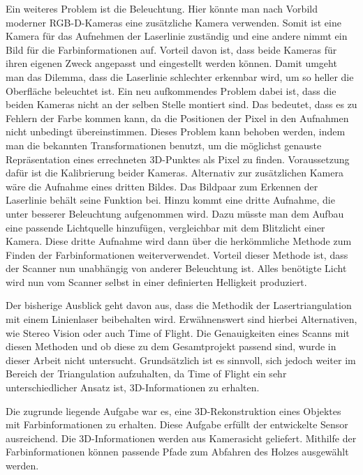 	Ein weiteres Problem ist die Beleuchtung. Hier könnte man nach Vorbild moderner RGB-D-Kameras eine zusätzliche Kamera verwenden. Somit ist eine Kamera für das Aufnehmen der Laserlinie zuständig und eine andere nimmt ein Bild für die Farbinformationen auf. Vorteil davon ist, dass beide Kameras für ihren eigenen Zweck angepasst und eingestellt werden können. Damit umgeht man das Dilemma, dass die Laserlinie schlechter erkennbar wird, um so heller die Oberfläche beleuchtet ist. Ein neu aufkommendes Problem dabei ist, dass die beiden Kameras nicht an der selben Stelle montiert sind. Das bedeutet, dass es zu Fehlern der Farbe kommen kann, da die Positionen der Pixel in den Aufnahmen nicht unbedingt übereinstimmen. Dieses Problem kann behoben werden, indem man die bekannten Transformationen benutzt, um die möglichst genauste Repräsentation eines errechneten 3D-Punktes als Pixel zu finden. Voraussetzung dafür ist die Kalibrierung beider Kameras. Alternativ zur zusätzlichen Kamera wäre die Aufnahme eines dritten Bildes. Das Bildpaar zum Erkennen der Laserlinie behält seine Funktion bei. Hinzu kommt eine dritte Aufnahme, die unter besserer Beleuchtung aufgenommen wird. Dazu müsste man dem Aufbau eine passende Lichtquelle hinzufügen, vergleichbar mit dem Blitzlicht einer Kamera. Diese dritte Aufnahme wird dann über die herkömmliche Methode zum Finden der Farbinformationen weiterverwendet. Vorteil dieser Methode ist, dass der Scanner nun unabhängig von anderer Beleuchtung ist. Alles benötigte Licht wird nun vom Scanner selbst in einer definierten Helligkeit produziert.
	
	Der bisherige Ausblick geht davon aus, dass die Methodik der Lasertriangulation mit einem Linienlaser beibehalten wird. Erwähnenswert sind hierbei Alternativen, wie Stereo Vision oder auch Time of Flight. Die Genauigkeiten eines Scanns mit diesen Methoden und ob diese zu dem Gesamtprojekt passend sind, wurde in dieser Arbeit nicht untersucht. Grundsätzlich ist es sinnvoll, sich jedoch weiter im Bereich der Triangulation aufzuhalten, da Time of Flight ein sehr unterschiedlicher Ansatz ist, 3D-Informationen zu erhalten.
	
	Die zugrunde liegende Aufgabe war es, eine 3D-Rekonstruktion eines Objektes mit Farbinformationen zu erhalten. Diese Aufgabe erfüllt der entwickelte Sensor ausreichend. Die 3D-Informationen werden aus Kamerasicht geliefert. Mithilfe der Farbinformationen können passende Pfade zum Abfahren des Holzes ausgewählt werden.